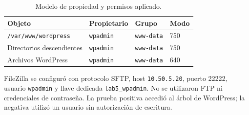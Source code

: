 \begin{table}[H]
  \centering
  \begin{tabular}{llll}
    \toprule
    \textbf{Objeto} & \textbf{Propietario} & \textbf{Grupo} & \textbf{Modo} \\
    \midrule
    \texttt{/var/www/wordpress} & \texttt{wpadmin} & \texttt{www-data} & 750 \\
    Directorios descendientes & \texttt{wpadmin} & \texttt{www-data} & 750 \\
    Archivos WordPress & \texttt{wpadmin} & \texttt{www-data} & 640 \\
    \bottomrule
  \end{tabular}
  \caption{Modelo de propiedad y permisos aplicado.}
\end{table}

FileZilla se configuró con protocolo SFTP, host \texttt{10.50.5.20}, puerto 22222, usuario \texttt{wpadmin} y llave dedicada \texttt{lab5\_wpadmin}. No se utilizaron FTP ni credenciales de contraseña. La prueba positiva accedió al árbol de WordPress; la negativa utilizó un usuario sin autorización de escritura.


